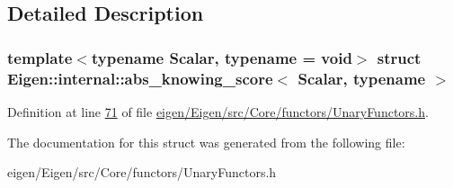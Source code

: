 \subsection{Detailed Description}
\subsubsection*{template$<$typename Scalar, typename = void$>$\newline
struct Eigen\+::internal\+::abs\+\_\+knowing\+\_\+score$<$ Scalar, typename $>$}



Definition at line \hyperlink{eigen_2_eigen_2src_2_core_2functors_2_unary_functors_8h_source_l00071}{71} of file \hyperlink{eigen_2_eigen_2src_2_core_2functors_2_unary_functors_8h_source}{eigen/\+Eigen/src/\+Core/functors/\+Unary\+Functors.\+h}.



The documentation for this struct was generated from the following file\+:\begin{DoxyCompactItemize}
\item 
eigen/\+Eigen/src/\+Core/functors/\+Unary\+Functors.\+h\end{DoxyCompactItemize}
